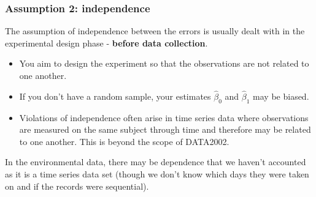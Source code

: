\documentclass[a4paper]{article}
\begin{document}
\subsubsection{Assumption 2: independence}
The assumption of independence between the errors is usually dealt with in the experimental design phase - \textbf{before data collection}.
\begin{itemize}
	\item You aim to design the experiment so that the observations are not related to one another.
	\item If you don't have a random sample, your estimates \( \hat{\beta}_0 \) and \( \hat{\beta}_1 \) may be biased.
	\item Violations of independence often arise in time series data where observations are measured on the same subject through time and therefore may be related to one another. This is beyond the scope of DATA2002.
\end{itemize}
In the environmental data, there may be dependence that we haven't accounted as it is a time series data set (though we don't know which days they were taken on and if the records were sequential).
\end{document}

